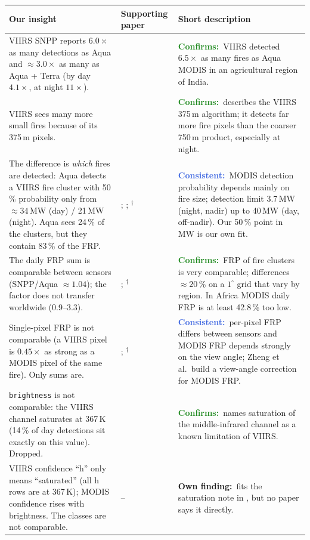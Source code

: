 \documentclass[10pt,a4paper]{article}
\newcommand{\fitlabel}[2]{\textcolor{#1}{\textbf{#2}}}
\newcommand{\confirms}{\fitlabel{ForestGreen}{Confirms:}}
\newcommand{\consistent}{\fitlabel{RoyalBlue}{Consistent:}}
\newcommand{\own}{\fitlabel{BurntOrange}{Own finding:}}
\newcommand{\abs}{$^\dagger$}   %
\newenvironment{insighttable}{%
  \small
  \begin{longtable}{L{0.36\textwidth} L{0.17\textwidth} L{0.41\textwidth}}
  \toprule
  \textbf{Our insight} & \textbf{Supporting paper} & \textbf{Short description} \\
  \midrule
  \endhead
  \bottomrule
  \endfoot
}{%
  \end{longtable}
}
\begin{document}
\begin{insighttable}
VIIRS SNPP reports $6.0\times$ as many detections as Aqua and $\approx 3.0\times$ as many as Aqua + Terra
(by day $4.1\times$, at night $11\times$).
& \citet{vadrevu2018}
& \confirms\ VIIRS detected $6.5\times$ as many fires as Aqua MODIS in an agricultural region of India. \\

VIIRS sees many more small fires because of its 375\,m pixels.
& \citet{schroeder2014}
& \confirms\ describes the VIIRS 375\,m algorithm; it detects far more fire pixels than the coarser 750\,m
product, especially at night. \\

The difference is \emph{which} fires are detected: Aqua detects a VIIRS fire cluster with 50\,\% probability
only from $\approx 34$\,MW (day) / 21\,MW (night). Aqua sees 24\,\% of the clusters, but they contain 83\,\% of the FRP.
& \citet{giglio2016}; \citet{schroeder2008}; \citet{sofiev2026}\abs
& \consistent\ MODIS detection probability depends mainly on fire size; detection limit 3.7\,MW (night, nadir)
up to 40\,MW (day, off-nadir). Our 50\,\% point in MW is our own fit. \\

The daily FRP sum is comparable between sensors (SNPP/Aqua $\approx 1.04$); the factor does not transfer
worldwide (0.9--3.3).
& \citet{li2018}; \citet{li2020}\abs
& \confirms\ FRP of fire clusters is very comparable; differences $\approx 20$\,\% on a $1^\circ$ grid that vary
by region. In Africa MODIS daily FRP is at least 42.8\,\% too low. \\

Single-pixel FRP is not comparable (a VIIRS pixel is $0.45\times$ as strong as a MODIS pixel of the same fire).
Only sums are.
& \citet{li2018}; \citet{zheng2026}\abs
& \consistent\ per-pixel FRP differs between sensors and MODIS FRP depends strongly on the view angle;
Zheng et al.\ build a view-angle correction for MODIS FRP. \\

\texttt{brightness} is not comparable: the VIIRS channel saturates at 367\,K (14\,\% of day detections sit
exactly on this value). Dropped.
& \citet{schroeder2014}
& \confirms\ names saturation of the middle-infrared channel as a known limitation of VIIRS. \\

VIIRS confidence ``h'' only means ``saturated'' (all h rows are at 367\,K); MODIS confidence rises with
brightness. The classes are not comparable.
& --
& \own\ fits the saturation note in \citet{schroeder2014}, but no paper says it directly. \\


\end{insighttable}
\end{document}

